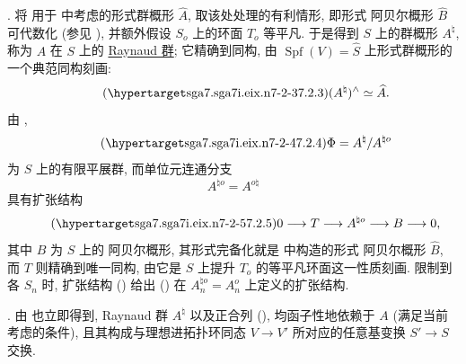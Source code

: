 \medskip
\noindent
{}. 将  用于  中考虑的形式群概形 $\widehat A$, 取该处处理的有利情形, 即形式 阿贝尔概形 $\widehat B$ 可代数化 (参见 ), 并额外假设 $S_o$ 上的环面 $T_o$ 等平凡. 于是得到 $S$ 上的群概形 $A^\natural$, 称为 $A$ 在 $S$ 上的 \underline{Raynaud 群}; 它精确到同构, 由 $\operatorname{Spf}(V)=\widehat S$ 上形式群概形的一个典范同构刻画:
\begin{equation}\tag{\SGARefTarget{sga7.sga7i.eix.n7-2-3}{7.2.3}}
 (A^\natural)^\wedge\simeq\widehat A.
\end{equation}
由 ,
\begin{equation}\tag{\SGARefTarget{sga7.sga7i.eix.n7-2-4}{7.2.4}}
 \Phi=A^\natural/A^{\natural o}
\end{equation}
为 $S$ 上的有限平展群, 而单位元连通分支
\[
 A^{\natural o}=A^{o\natural}
\]
具有扩张结构
\begin{equation}\tag{\SGARefTarget{sga7.sga7i.eix.n7-2-5}{7.2.5}}
 0\longrightarrow T\longrightarrow A^{\natural o}
 \longrightarrow B\longrightarrow0,
\end{equation}
其中 $B$ 为 $S$ 上的 阿贝尔概形, 其形式完备化就是  中构造的形式 阿贝尔概形 $\widehat B$, 而 $T$ 则精确到唯一同构, 由它是 $S$ 上提升 $T_o$ 的等平凡环面这一性质刻画. 限制到各 $S_n$ 时, 扩张结构 () 给出 () 在 $A_n^{\natural o}=A_n^o$ 上定义的扩张结构.

\medskip
\noindent
{}. 由  也立即得到, Raynaud 群 $A^\natural$ 以及正合列 (), 均函子性地依赖于 $A$ (满足当前考虑的条件), 且其构成与理想进拓扑环同态 $V\longrightarrow V'$ 所对应的任意基变换 $S'\longrightarrow S$ 交换.



